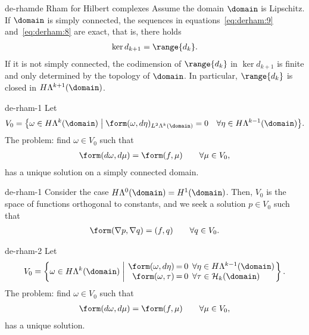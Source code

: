 \begin{Theorem*}{de-rham}{de Rham for Hilbert complexes}
  Assume the domain $\domain$ is Lipschitz.  If $\domain$ is simply
  connected, the sequences in equations~\eqref{eq:derham:9}
  and~\eqref{eq:derham:8} are exact, that is, there holds
  \begin{gather}
    \label{eq:derham:7}
    \ker {d_{k+1}} = \range{d_k}.
  \end{gather}
  If it is not simply connected, the codimension of $\range{d_k}$ in
  $\ker{d_{k+1}}$ is finite and only determined by the topology of
  $\domain$. In particular, $\range{d_k}$ is closed in
  $H\Lambda^{k+1}(\domain)$.
\end{Theorem*}

\begin{Corollary}{de-rham-1}
  Let
  \begin{gather}
    V_0 = \bigl\{ \omega\in H\Lambda^k(\domain)
    \; \big| \;
    \form(\omega, d\eta)_{L^2\Lambda^k(\domain)} = 0
    \quad\forall\eta\in H\Lambda^{k-1}(\domain)\bigr\}.
  \end{gather}
  The problem: find $\omega\in V_0$ such that
  \begin{gather}
    \form(d \omega, d\mu) = \form(f,\mu)
    \qquad\forall \mu\in V_0,
  \end{gather}
  has a unique solution on a simply connected domain.
\end{Corollary}

\begin{Example}{de-rham-1}
  Consider the case $H\Lambda^0(\domain) = H^1(\domain)$. Then, $V_0$
  is the space of functions orthogonal to constants, and we seek a
  solution $p\in  V_0$ such that
  \begin{gather}
    \form(\nabla p, \nabla q) = (f,q) \qquad\forall q\in V_0.
  \end{gather}
\end{Example}

\begin{Corollary}{de-rham-2}
  Let
  \begin{gather}
    V_0 = \left\{ \omega\in H\Lambda^k(\domain)
        \; \middle| \;
        \arraycolsep1pt
        \begin{array}{rcll}
          \form(\omega, d\eta)
          &=&0
          &\;\forall\eta\in H\Lambda^{k-1}(\domain)\\
          \form(\omega,\tau)
          &=&0
          &\;\forall \tau\in \mathcal H_k(\domain)
        \end{array}
  \right\}.
  \end{gather}
  The problem: find $\omega\in V_0$ such that
  \begin{gather}
    \form(d \omega, d\mu) = \form(f,\mu)
    \qquad\forall \mu\in V_0,
  \end{gather}
  has a unique solution.
\end{Corollary}


